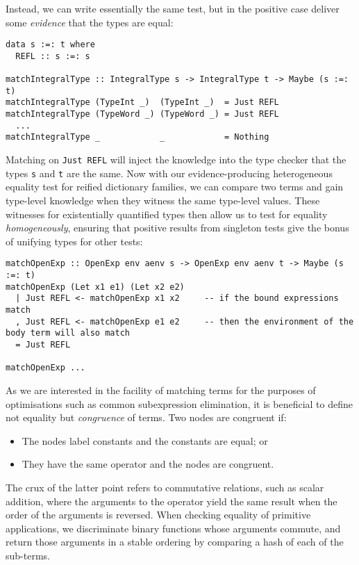 Instead, we can write essentially the same test, but in the positive case
deliver some \emph{evidence} that the types are equal:
%
\begin{lstlisting}[style=haskell]
data s :=: t where
  REFL :: s :=: s

matchIntegralType :: IntegralType s -> IntegralType t -> Maybe (s :=: t)
matchIntegralType (TypeInt _)  (TypeInt _)  = Just REFL
matchIntegralType (TypeWord _) (TypeWord _) = Just REFL
  ...
matchIntegralType _            _            = Nothing
\end{lstlisting}
%
Matching on \lstinline{Just REFL} will inject the knowledge into the type
checker that the types \texttt{s} and \texttt{t} are the same. Now with our
evidence-producing heterogeneous equality test for reified dictionary families,
we can compare two terms and gain type-level knowledge when they witness the
same type-level values. These witnesses for existentially quantified types then
allow us to test for equality \emph{homogeneously}, ensuring that positive
results from singleton tests give the bonus of unifying types for other tests:
%
\begin{lstlisting}[style=haskell]
matchOpenExp :: OpenExp env aenv s -> OpenExp env aenv t -> Maybe (s :=: t)
matchOpenExp (Let x1 e1) (Let x2 e2)
  | Just REFL <- matchOpenExp x1 x2     -- if the bound expressions match
  , Just REFL <- matchOpenExp e1 e2     -- then the environment of the body term will also match
  = Just REFL

matchOpenExp ...
\end{lstlisting}

As we are interested in the facility of matching terms for the purposes of
optimisations such as common subexpression elimination, it is beneficial to
define not equality but \emph{congruence} of terms. Two nodes are congruent if:
%
\begin{itemize}
    \item The nodes label constants and the constants are equal; or
    \item They have the same operator and the nodes are congruent.
\end{itemize}
%
The crux of the latter point refers to commutative relations, such as scalar
addition, where the arguments to the operator yield the same result when the
order of the arguments is reversed. When checking equality of primitive
applications, we discriminate binary functions whose arguments commute, and
return those arguments in a stable ordering by comparing a hash of each of the
sub-terms.
%
%
%


